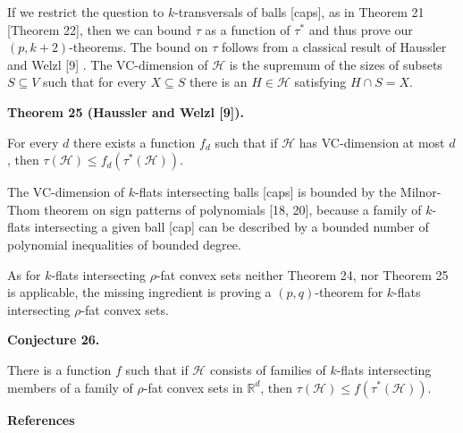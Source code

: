 \par
\par
If we restrict the question to $k$-transversals of balls [caps], as in Theorem 21 [Theorem 22], then we can bound $\tau$ as a function of $\tau^{*}$ and thus prove our $(p,k+2)$-theorems. The bound on $\tau$ follows from a classical result of Haussler and Welzl [9] . The VC-dimension of $\mathcal{H}$ is the supremum of the sizes of subsets $S\subseteq V$ such that for every $X\subseteq S$ there is an $H\in\mathcal{H}$ satisfying $H\cap S=X$.
\par
\par
\par\medskip\noindent\textbf{Theorem 25 (Haussler and Welzl [9]).}\par
For every $d$ there exists a function $f_{d}$ such that if $\mathcal{H}$ has VC-dimension at most $d$, then $\tau(\mathcal{H})\leq f_{d}(\tau^{*}(\mathcal{H}))$.
\par
\par
\par
The VC-dimension of $k$-flats intersecting balls [caps] is bounded by the Milnor-Thom theorem on sign patterns of polynomials [18, 20], because a family of $k$-flats intersecting a given ball [cap] can be described by a bounded number of polynomial inequalities of bounded degree.
\par
\par
As for $k$-flats intersecting $\rho$-fat convex sets neither Theorem 24, nor Theorem 25 is applicable, the missing ingredient is proving a $(p,q)$-theorem for $k$-flats intersecting $\rho$-fat convex sets.
\par
\par
\par\medskip\noindent\textbf{Conjecture 26.}\par
There is a function $f$ such that if $\mathcal{H}$ consists of families of $k$-flats intersecting members of a family of $\rho$-fat convex sets in $\mathbb{R}^{d}$, then $\tau(\mathcal{H})\leq f(\tau^{*}(\mathcal{H}))$.
\par
\par
\par
\par\medskip\noindent\textbf{References}\par
